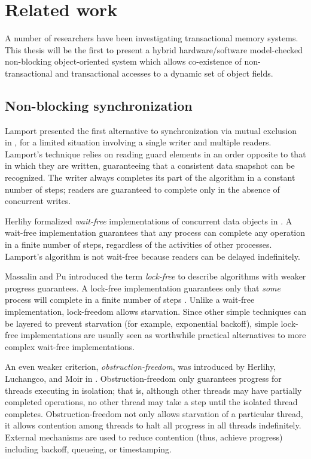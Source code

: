 \section{Related work}\label{sec:related}

A number of researchers have been investigating transactional memory
systems.  This thesis will be the first to present a hybrid hardware/software
model-checked non-blocking
object-oriented system which allows co-existence of non-transactional and
transactional accesses to a dynamic set of object fields.

\subsection{Non-blocking synchronization}\label{sec:nb-sync}

Lamport presented the first alternative to synchronization via mutual
exclusion in \cite{Lamport77}, for a limited situation involving a single
writer and multiple readers.  Lamport's technique relies on reading
guard elements in an order opposite to that in which they are written,
guaranteeing that a consistent data snapshot can be recognized.  The
writer always completes its part of the algorithm in a constant number
of steps; readers are guaranteed to complete only in the absence of
concurrent writes.

Herlihy formalized \emph{wait-free} implementations of
concurrent data objects in \cite{Herlihy88}.  A wait-free implementation
guarantees that any process can complete any operation in a finite
number of steps, regardless of the activities of other processes.
Lamport's algorithm is not wait-free
because readers can be delayed indefinitely.

Massalin and Pu introduced the term \emph{lock-free} to describe 
algorithms with weaker progress guarantees.
A lock-free implementation guarantees only that \emph{some}
process will complete in a finite number of steps
\cite{MassalinPu91}.  Unlike a wait-free implementation,
lock-freedom allows starvation.  Since other simple techniques can be
layered to prevent starvation (for example, exponential backoff),
simple lock-free implementations are usually seen as worthwhile practical
alternatives to more complex wait-free implementations.

An even weaker criterion, \emph{obstruction-freedom}, was introduced
by Herlihy, Luchangco, and Moir in \cite{HerlihyLuMo03}.
Obstruction-freedom only guarantees progress for threads executing in
isolation; that is, although other threads may have partially
completed operations, no other thread may take a step until the
isolated thread completes.  Obstruction-freedom not only allows
starvation of a particular thread, it allows contention among threads
to halt all progress in all threads
indefinitely.  External mechanisms are used to reduce contention
(thus, achieve progress) including backoff, queueing, or timestamping.

